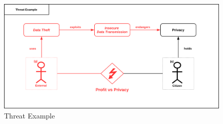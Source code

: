 \begin{figure}
\centering
\includegraphics[width=\textwidth]{diagrams/png/threat-example.png}
\caption{Threat Example}
\label{figure:Threat-Example}
\end{figure}
